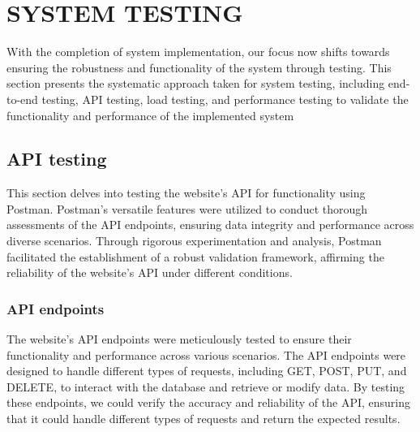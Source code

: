\chapter{SYSTEM TESTING}

With the completion of system implementation, our focus now shifts towards ensuring the robustness and functionality of the system through testing. This section presents the systematic approach taken for system testing, including end-to-end testing, API testing, load testing, and performance testing to validate the functionality and performance of the implemented system

\section{API testing}
This section delves into testing the website's API for functionality using 
Postman. Postman's versatile features were utilized to conduct thorough 
assessments of the API endpoints, ensuring data integrity and performance 
across diverse scenarios. Through rigorous experimentation and analysis, 
Postman facilitated the establishment of a robust validation framework, 
affirming the reliability of the website's API under different conditions.

\subsection{API endpoints}
The website's API endpoints were meticulously tested to ensure their
functionality and performance across various scenarios. The API endpoints
were designed to handle different types of requests, including GET, POST,
PUT, and DELETE, to interact with the database and retrieve or modify
data. By testing these endpoints, we could verify the accuracy and
reliability of the API, ensuring that it could handle different types of
requests and return the expected results.


